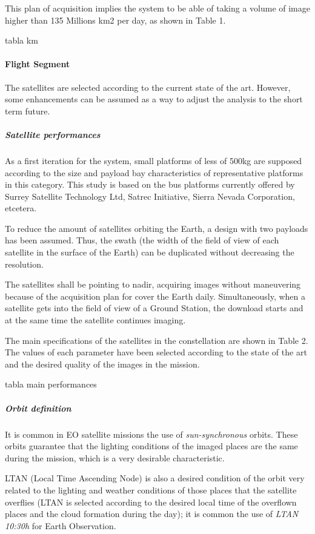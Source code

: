 This plan of acquisition implies the system to be able of taking a volume of
image higher than 135 Millions km2 per day, as shown in Table 1.

tabla km

\paragraph{Flight Segment}
The satellites are selected according to the current state of the art. However,
some enhancements can be assumed as a way to adjust the analysis to the short
term future.


\subparagraph{Satellite performances}
As a first iteration for the system, small platforms of less of 500kg are supposed according to the size and payload bay characteristics of representative platforms in this category. This study is based on the bus platforms currently offered by Surrey Satellite Technology Ltd, Satrec Initiative, Sierra Nevada Corporation, etcetera. 

To reduce the amount of satellites orbiting the Earth, a design with two payloads has been assumed. Thus, the swath (the width of the field of view of each satellite in the surface of the Earth) can be duplicated without decreasing the resolution.

The satellites shall be pointing to nadir, acquiring images without maneuvering because of the acquisition plan for cover the Earth daily. Simultaneously, when a satellite gets into the field of view of a Ground Station, the download starts and at the same time the satellite continues imaging.

The main specifications of the satellites in the constellation are shown in Table 2. The values of each parameter have been selected according to the state of the art and the desired quality of the images in the mission.


tabla main performances

\subparagraph{Orbit definition}
It is common in EO satellite missions the use of \emph{sun-synchronous} orbits. These orbits guarantee that the lighting conditions of the imaged places are the same during the mission, which is a very desirable characteristic. 

LTAN (Local Time Ascending Node) is also a desired condition of the orbit very related to the lighting and weather conditions of those places that the satellite overflies (LTAN is selected according to the desired local time of the overflown places and the cloud formation during the day); it is common the use of \emph{LTAN 10:30h} for Earth Observation. 

